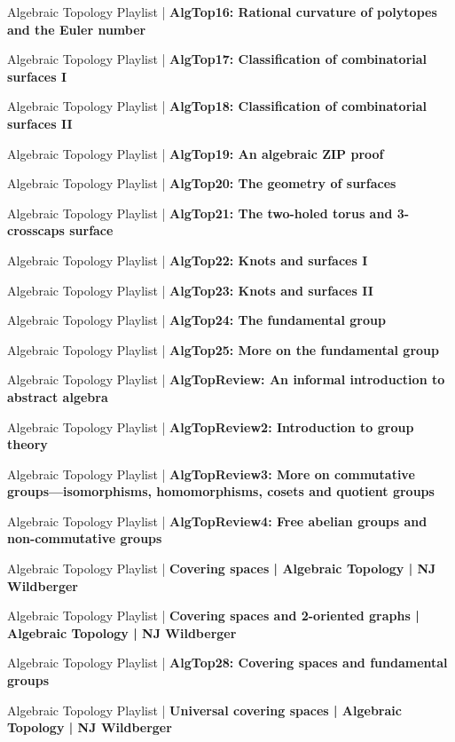 \documentclass[a4, landscape, 12pt]{article}
\newcommand{\checkbox}{$\square$}%
\begin{document}
\begin{itemize}
{{}
\item [\checkbox] Algebraic Topology Playlist  | \textbf{AlgTop16: Rational curvature of polytopes and the Euler number
}
\item [\checkbox] Algebraic Topology Playlist  | \textbf{AlgTop17: Classification of combinatorial surfaces I
}
\item [\checkbox] Algebraic Topology Playlist  | \textbf{AlgTop18: Classification of combinatorial surfaces II
}
\item [\checkbox] Algebraic Topology Playlist  | \textbf{AlgTop19: An algebraic ZIP proof
}
\item [\checkbox] Algebraic Topology Playlist  | \textbf{AlgTop20: The geometry of surfaces
}
\item [\checkbox] Algebraic Topology Playlist  | \textbf{AlgTop21: The two-holed torus and 3-crosscaps surface
}
\item [\checkbox] Algebraic Topology Playlist  | \textbf{AlgTop22: Knots and surfaces I
}
\item [\checkbox] Algebraic Topology Playlist  | \textbf{AlgTop23: Knots and surfaces II
}
\item [\checkbox] Algebraic Topology Playlist  | \textbf{AlgTop24: The fundamental group
}
\item [\checkbox] Algebraic Topology Playlist  | \textbf{AlgTop25: More on the fundamental group
}
\item [\checkbox] Algebraic Topology Playlist  | \textbf{AlgTopReview: An informal introduction to abstract algebra
}
\item [\checkbox] Algebraic Topology Playlist  | \textbf{AlgTopReview2: Introduction to group theory
}
\item [\checkbox] Algebraic Topology Playlist  | \textbf{AlgTopReview3: More on commutative groups---isomorphisms, homomorphisms, cosets and quotient groups
}
\item [\checkbox] Algebraic Topology Playlist  | \textbf{AlgTopReview4: Free abelian groups and non-commutative groups
}
\item [\checkbox] Algebraic Topology Playlist  | \textbf{Covering spaces | Algebraic Topology | NJ Wildberger
}
\item [\checkbox] Algebraic Topology Playlist  | \textbf{Covering spaces and 2-oriented graphs | Algebraic Topology | NJ Wildberger
}
\item [\checkbox] Algebraic Topology Playlist  | \textbf{AlgTop28: Covering spaces and fundamental groups
}
\item [\checkbox] Algebraic Topology Playlist  | \textbf{Universal covering spaces | Algebraic Topology | NJ Wildberger
}}
\end{itemize}
\end{document}
